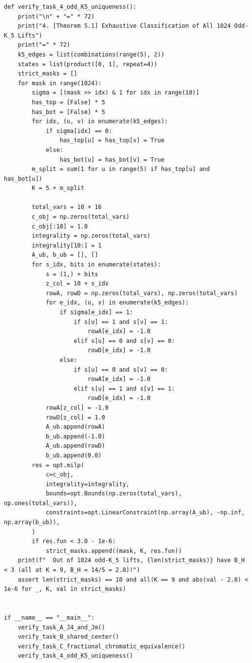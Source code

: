 \documentclass[11pt,a4paper]{ctexart}
\theoremstyle{definition}
\newcommand{\1}{\boldsymbol 1}
\newcommand{\0}{\boldsymbol 0}
\begin{document}
\begin{lstlisting}[style=pycode,caption={一般 $B_{\rm graph}$ 核心定理与复杂性归约构件精确复核脚本（\texttt{Bgraph\_breakthrough\_verify.py}）}]
def verify_task_4_odd_K5_uniqueness():
    print("\n" + "=" * 72)
    print("4. [Theorem 5.1] Exhaustive Classification of All 1024 Odd-K_5 Lifts")
    print("=" * 72)
    k5_edges = list(combinations(range(5), 2))
    states = list(product([0, 1], repeat=4))
    strict_masks = []
    for mask in range(1024):
        sigma = [(mask >> idx) & 1 for idx in range(10)]
        has_top = [False] * 5
        has_bot = [False] * 5
        for idx, (u, v) in enumerate(k5_edges):
            if sigma[idx] == 0:
                has_top[u] = has_top[v] = True
            else:
                has_bot[u] = has_bot[v] = True
        m_split = sum(1 for u in range(5) if has_top[u] and has_bot[u])
        K = 5 + m_split

        total_vars = 10 + 16
        c_obj = np.zeros(total_vars)
        c_obj[:10] = 1.0
        integrality = np.zeros(total_vars)
        integrality[10:] = 1
        A_ub, b_ub = [], []
        for s_idx, bits in enumerate(states):
            s = (1,) + bits
            z_col = 10 + s_idx
            rowA, rowD = np.zeros(total_vars), np.zeros(total_vars)
            for e_idx, (u, v) in enumerate(k5_edges):
                if sigma[e_idx] == 1:
                    if s[u] == 1 and s[v] == 1:
                        rowA[e_idx] = -1.0
                    elif s[u] == 0 and s[v] == 0:
                        rowD[e_idx] = -1.0
                else:
                    if s[u] == 0 and s[v] == 0:
                        rowA[e_idx] = -1.0
                    elif s[u] == 1 and s[v] == 1:
                        rowD[e_idx] = -1.0
            rowA[z_col] = -1.0
            rowD[z_col] = 1.0
            A_ub.append(rowA)
            b_ub.append(-1.0)
            A_ub.append(rowD)
            b_ub.append(0.0)
        res = opt.milp(
            c=c_obj,
            integrality=integrality,
            bounds=opt.Bounds(np.zeros(total_vars), np.ones(total_vars)),
            constraints=opt.LinearConstraint(np.array(A_ub), -np.inf, np.array(b_ub)),
        )
        if res.fun < 3.0 - 1e-6:
            strict_masks.append((mask, K, res.fun))
    print(f"  Out of 1024 odd-K_5 lifts, {len(strict_masks)} have B_H < 3 (all at K = 9, B_H = 14/5 = 2.8)!")
    assert len(strict_masks) == 10 and all(K == 9 and abs(val - 2.8) < 1e-6 for _, K, val in strict_masks)


if __name__ == "__main__":
    verify_task_A_J4_and_Jm()
    verify_task_B_shared_center()
    verify_task_C_fractional_chromatic_equivalence()
    verify_task_4_odd_K5_uniqueness()
\end{lstlisting}
\end{document}
